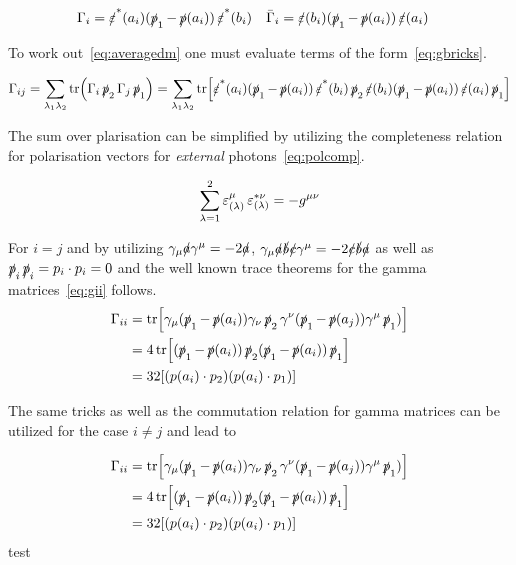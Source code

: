 \begin{align}
  \label{eq:shortgamma}
  \Gamma_i &= \pses(a_i)(\ps_1 - \ps(a_i))\pses(b_i) & \bar{\Gamma}_i &= \pes(b_i)(\ps_1 - \ps(a_i))\pes(a_i)
\end{align}

To work out~\eqref{eq:averagedm} one must evaluate terms of the
form~\eqref{eq:gbricks}.

\begin{align}
  \label{eq:gbricks}
  \Gamma_{ij} = \sum_{\lambda_1\lambda_2} \tr(\Gamma_i\ps_2\Gamma_j\ps_1) =
  \sum_{\lambda_1\lambda_2} \tr[\pses(a_i)(\ps_1-\ps(a_i))\pses(b_i)\ps_2\pes(b_i)(\ps_1 - \ps(a_i))\pes(a_i)\ps_1]
\end{align}

The sum over plarisation can be simplified by utilizing the
completeness relation for polarisation vectors for \emph{external}
photons~\eqref{eq:polcomp}.

\begin{equation}
  \label{eq:polcomp}
  \sum_{\lambda=1}^{2}\pe_{(\lambda)}^\mu\pe_{(\lambda)}^{*\nu} = -g^{\mu\nu}
\end{equation}

For \(i=j\) and by utilizing \(\gamma_\mu\sl{a}\gamma^\mu=-2\sl{a}\),
 \(\gamma_\mu\sl{a}\sl{b}\sl{c}\gamma^\mu=-2\sl{c}\sl{b}\sl{a}\) as
well as \(\ps_i\ps_i=p_i\cdot p_i = 0\) and the well known trace
theorems for the gamma matrices~\eqref{eq:gii} follows.
\begin{equation}
  \label{eq:gii}
  \begin{split}
\Gamma_{ii} &=
\tr[\gamma_\mu(\ps_1-\ps(a_i))\gamma_\nu\ps_2\gamma^\nu(\ps_1-\ps(a_j))\gamma^\mu\ps_1)]
\\
&= 4\tr[(\ps_1-\ps(a_i))\ps_2(\ps_1-\ps(a_i))\ps_1]\\
&= 32\qty[(p(a_i)\cdot p_2)(p(a_i)\cdot p_1)]
\end{split}
\end{equation}

The same tricks as well as the commutation relation for gamma matrices
can be utilized for the case \(i\neq j\) and lead to

\begin{equation}
  \label{eq:gii}
  \begin{split}
\Gamma_{ii} &=
\tr[\gamma_\mu(\ps_1-\ps(a_i))\gamma_\nu\ps_2\gamma^\nu(\ps_1-\ps(a_j))\gamma^\mu\ps_1)]
\\
&= 4\tr[(\ps_1-\ps(a_i))\ps_2(\ps_1-\ps(a_i))\ps_1]\\
&= 32\qty[(p(a_i)\cdot p_2)(p(a_i)\cdot p_1)]
\end{split}
\end{equation}
test
